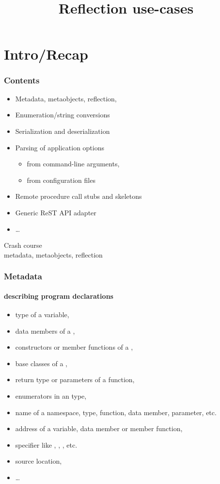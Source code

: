 \documentclass[compress,table,xcolor=table]{beamer}
\begin{document}
\title{Reflection use-cases}
\section{Intro/Recap}
\frame{\titlepage}
\begin{frame}
  \frametitle{Contents}
  \begin{itemize}
    \item Metadata, metaobjects, reflection, 
    \item Enumeration/string conversions
    \item Serialization and deserialization
    \item Parsing of application options 
    \begin{itemize}
      \smaller
      \item from command-line arguments,
      \item from configuration files
    \end{itemize}
    \item Remote procedure call stubs and skeletons
    \item Generic ReST API adapter
    \item \ldots
  \end{itemize}
\end{frame}
\begin{frame}[c]
  \Huge
  \centering
  Crash course\\
  \large
  metadata, metaobjects, reflection
\end{frame}
\begin{frame}
  \frametitle{Metadata}
  \framesubtitle{describing program declarations}
  \larger
  \begin{itemize}
    \item type of a variable,
    \item data members of a ,
    \item constructors or member functions of a ,
    \item base classes of a ,
    \item return type or parameters of a function,
    \item enumerators in an  type,
    \item name of a namespace, type, function, data member, parameter, etc.
    \item address of a variable, data member or member function,
    \item specifier like , ,
      , etc.
    \item source location,
    \item \ldots
  \end{itemize}
\end{frame}
\end{document}
